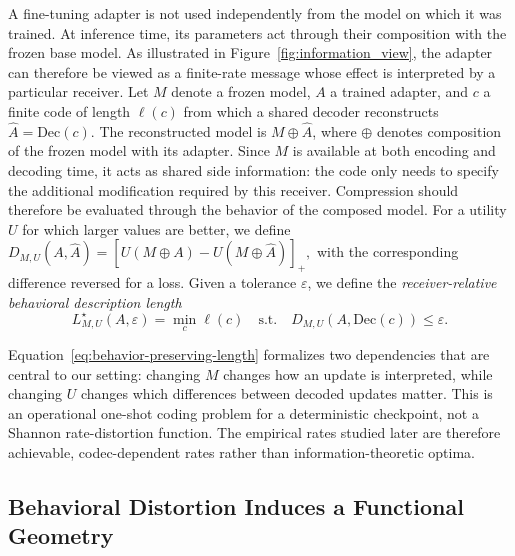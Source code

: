 A fine-tuning adapter is not used independently from the model on which it was trained.
At inference time, its parameters act through their composition with the frozen base model.
As illustrated in Figure~\ref{fig:information_view}, the adapter can therefore be viewed as a finite-rate message whose effect is interpreted by a particular receiver.
Let $M$ denote a frozen model, $A$ a trained adapter, and $c$ a finite code of length $\ell(c)$ from which a shared decoder reconstructs
$\hat A = \mathrm{Dec}(c).$
The reconstructed model is $M\oplus\hat A$, where $\oplus$ denotes composition of the frozen model with its adapter.
Since $M$ is available at both encoding and decoding time, it acts as shared side information: the code only needs to specify the additional modification required by this receiver.
\newline
Compression should therefore be evaluated through the behavior of the composed model.
For a utility $U$ for which larger values are better, we define
\(
    D_{M,U}(A,\hat A)
    =
    \left[
        U(M\oplus A)-U(M\oplus\hat A)
    \right]_+ ,
\)
with the corresponding difference reversed for a loss.
Given a tolerance $\varepsilon$, we define the \emph{receiver-relative behavioral description length}
\begin{equation}
    L^\star_{M,U}(A,\varepsilon)
    =
    \min_c \ell(c)
    \quad
    \mathrm{s.t.}
    \quad
    D_{M,U}\!\left(A,\mathrm{Dec}(c)\right)
    \leq \varepsilon .
    \label{eq:behavior-preserving-length}
\end{equation}

Equation~\ref{eq:behavior-preserving-length} formalizes two dependencies that are central to our setting:
changing $M$ changes how an update is interpreted, while changing $U$ changes which differences between decoded updates matter.
This is an operational one-shot coding problem for a deterministic checkpoint, not a Shannon rate-distortion function.
The empirical rates studied later are therefore achievable, codec-dependent rates rather than information-theoretic optima.

\subsection{Behavioral Distortion Induces a Functional Geometry}

